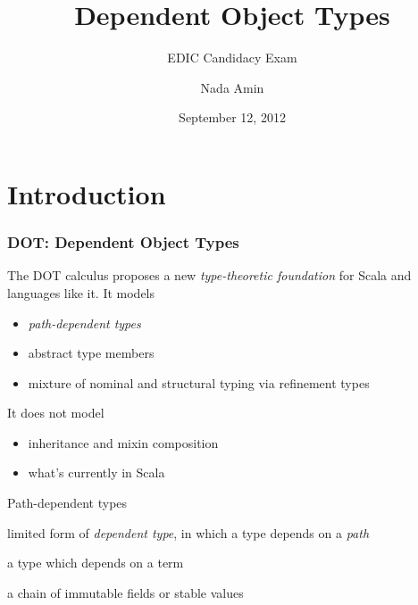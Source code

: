 \documentclass{beamer}
\title{Dependent Object Types}
\subtitle{EDIC Candidacy Exam}
\author{Nada Amin}
\institute{LAMP, I\&C, EPFL}
\date{September 12, 2012}
\begin{document}
\frame{\titlepage}

\section{Introduction}

\begin{frame}
\frametitle{DOT: Dependent Object Types}

The DOT calculus proposes a new \emph{type-theoretic foundation} for Scala
and languages like it. It models
\begin{itemize}
\item \emph{path-dependent types}
\item abstract type members
\item mixture of nominal and structural typing via refinement types
\end{itemize}

It does not model
\begin{itemize}
\item inheritance and mixin composition
\item what's currently in Scala
\end{itemize}

\end{frame}

\begin{frame}[fragile]{Path-dependent types}

\begin{description}
\item[path-dependent type] limited form of \emph{dependent type}, in which a type depends on a \emph{path}
\item[dependent type] a type which depends on a term
\item[path] a chain of immutable fields or stable values
\end{description}

\inputminted[fontsize=\footnotesize]{scala}{intro.scala}
\end{frame}
\end{document}

